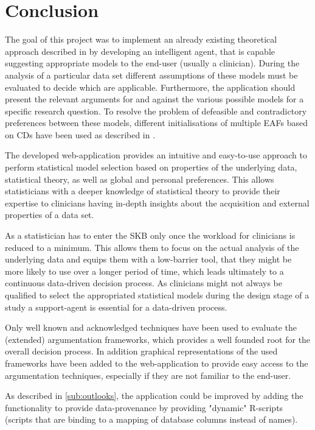 \section{Conclusion}
\label{sec:conclusion}
The goal of this project was to implement an already existing theoretical approach described in \cite{sassoon2016, sassoon2014, sassoon2016CD} by developing an intelligent agent, that is capable suggesting appropriate models to the end-user (usually a clinician). During the analysis of a particular data set different assumptions of these models must be evaluated to decide which are applicable. Furthermore, the application should present the relevant arguments for and against the various possible models  for a specific research question. To resolve the problem of defeasible and contradictory preferences between these models, different initialisations of multiple \glspl{EAF} based on \glspl{CD} have been used as described in \cite{sassoon2016, sassoon2016CD}.

The developed web-application provides an intuitive and easy-to-use approach to perform statistical model selection based on properties of the underlying data, statistical theory, as well as global and personal preferences. This allows statisticians with a deeper knowledge of statistical theory to provide their expertise to clinicians having in-depth insights about the acquisition and external properties of a data set. 

As a statistician has to enter the \gls{SKB} only once the workload for clinicians is reduced to a minimum. This allows them to focus on the actual analysis of the underlying data and equips them with a low-barrier tool, that they might be more likely to use over a longer period of time, which leads ultimately to a continuous data-driven decision process. As clinicians might not always be qualified to select the appropriated statistical models during the design stage of a study \cite{sassoon2014} a support-agent is essential for a data-driven process.

Only well known and acknowledged techniques have been used to evaluate the (extended) argumentation frameworks, which provides a well founded root for the overall decision process. In addition graphical representations of the used frameworks have been added to the web-application to provide easy access to the argumentation techniques, especially if they are not familiar to the end-user.

As described in \autoref{sub:outlooks}, the application could be improved by adding the functionality to provide data-provenance by providing "dynamic" \gls{R}-scripts (scripts that are binding to a mapping of database columns instead of names). 

